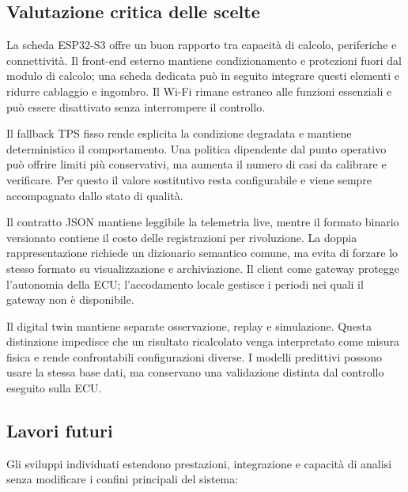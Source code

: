 \documentclass{article}
\begin{document}
\subsection{Valutazione critica delle scelte}

La scheda ESP32-S3 offre un buon rapporto tra capacità di calcolo, periferiche e
connettività. Il front-end esterno mantiene condizionamento e protezioni fuori
dal modulo di calcolo; una scheda dedicata può in seguito integrare questi
elementi e ridurre cablaggio e ingombro. Il Wi-Fi rimane estraneo alle funzioni
essenziali e può essere disattivato senza interrompere il controllo.

Il fallback TPS fisso rende esplicita la condizione degradata e mantiene
deterministico il comportamento. Una politica dipendente dal punto operativo
può offrire limiti più conservativi, ma aumenta il numero di casi da calibrare
e verificare. Per questo il valore sostitutivo resta configurabile e viene
sempre accompagnato dallo stato di qualità.

Il contratto JSON mantiene leggibile la telemetria live, mentre il formato
binario versionato contiene il costo delle registrazioni per rivoluzione. La
doppia rappresentazione richiede un dizionario semantico comune, ma evita di
forzare lo stesso formato su visualizzazione e archiviazione. Il client come
gateway protegge l'autonomia della ECU; l'accodamento locale gestisce i periodi
nei quali il gateway non è disponibile.

Il digital twin mantiene separate osservazione, replay e simulazione. Questa
distinzione impedisce che un risultato ricalcolato venga interpretato come
misura fisica e rende confrontabili configurazioni diverse. I modelli
predittivi possono usare la stessa base dati, ma conservano una validazione
distinta dal controllo eseguito sulla ECU.

\subsection{Lavori futuri}

Gli sviluppi individuati estendono prestazioni, integrazione e capacità di
analisi senza modificare i confini principali del sistema:
\end{document}
